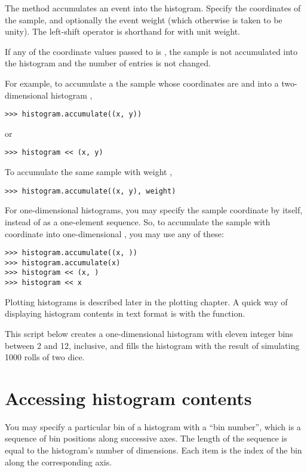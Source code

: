 The  method accumulates an event into the histogram.
Specify the coordinates of the sample, and optionally the event weight
(which otherwise is taken to be unity).  The left-shift operator
\code{<<} is shorthand for  with unit weight.

If any of the coordinate values passed to  is
, the sample is not accumulated into the histogram and the number
of entries is not changed.

For example, to accumulate a the sample whose coordinates are 
and  into a two-dimensional histogram ,
\begin{verbatim}
>>> histogram.accumulate((x, y))
\end{verbatim}
or
\begin{verbatim}
>>> histogram << (x, y)
\end{verbatim}
To accumulate the same sample with weight ,
\begin{verbatim}
>>> histogram.accumulate((x, y), weight)
\end{verbatim}

For one-dimensional histograms, you may specify the sample coordinate by
itself, instead of as a one-element sequence.  So, to accumulate the
sample with coordinate  into one-dimensional ,
you may use any of these:
\begin{verbatim}
>>> histogram.accumulate((x, ))
>>> histogram.accumulate(x)
>>> histogram << (x, )
>>> histogram << x
\end{verbatim}

Plotting histograms is described later in the plotting chapter.  A quick
way of displaying histogram contents in text format is with the
 function.

This script below creates a one-dimensional histogram with eleven
integer bins between 2 and 12, inclusive, and fills the histogram with
the result of simulating 1000 rolls of two dice.


\section{Accessing histogram contents}

You may specify a particular bin of a histogram with a ``bin number'',
which is a sequence of bin positions along successive axes.  The length
of the sequence is equal to the histogram's number of dimensions.  Each
item is the index of the bin along the corresponding axis.

